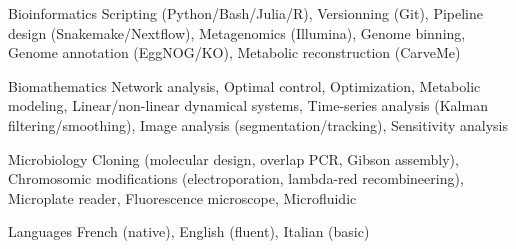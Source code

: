 

\begin{cvskills}

  \cvskill
    {Bioinformatics} %
    {Scripting (Python/Bash/Julia/R), Versionning (Git), Pipeline design (Snakemake/Nextflow),
    \linebreak Metagenomics (Illumina), Genome binning, Genome annotation (EggNOG/KO), Metabolic reconstruction (CarveMe)} %

  \cvskill
    {Biomathematics} %
    {Network analysis, Optimal control, Optimization, Metabolic modeling, Linear/non-linear dynamical systems, \linebreak Time-series analysis (Kalman filtering/smoothing), Image analysis (segmentation/tracking), Sensitivity analysis} %

  \cvskill
    {Microbiology} %
    {Cloning (molecular design, overlap PCR, Gibson assembly), Chromosomic modifications (electroporation, lambda-red recombineering), Microplate reader, Fluorescence microscope, Microfluidic} %

  \cvskill
    {Languages} %
    {French (native), English (fluent), Italian (basic) } %

\end{cvskills}
